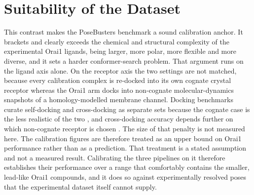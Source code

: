 
\hypertarget{suitability-of-the-dataset}{%
\section{Suitability of the Dataset}\label{suitability-of-the-dataset}}

This contrast makes the PoseBusters benchmark a sound calibration anchor. It brackets and clearly exceeds the chemical and structural complexity of the experimental Orai1 ligands, being larger, more polar, more flexible and more diverse, and it sets a harder conformer-search problem. That argument runs on the ligand axis alone. On the receptor axis the two settings are not matched, because every calibration complex is re-docked into its own cognate crystal receptor whereas the Orai1 arm docks into non-cognate molecular-dynamics snapshots of a homology-modelled membrane channel. Docking benchmarks curate self-docking and cross-docking as separate sets because the cognate case is the less realistic of the two \cite{ref012}, and cross-docking accuracy depends further on which non-cognate receptor is chosen \cite{ref033}. The size of that penalty is not measured here. The calibration figures are therefore treated as an upper bound on Orai1 performance rather than as a prediction. That treatment is a stated assumption and not a measured result. Calibrating the three pipelines on it therefore establishes their performance over a range that comfortably contains the smaller, lead-like Orai1 compounds, and it does so against experimentally resolved poses that the experimental dataset itself cannot supply.


